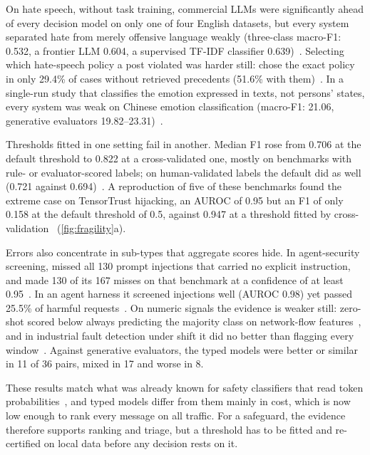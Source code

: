 On hate speech, without task training, commercial LLMs were significantly ahead of every decision model on only one of four English datasets, but every system separated hate from merely offensive language weakly (three-class macro-F1: \jev{} 0.532, a frontier LLM 0.604, a supervised TF-IDF classifier 0.639)~\cite{arx03324}.
Selecting which hate-speech policy a post violated was harder still: \jev{} chose the exact policy in only 29.4\% of cases without retrieved precedents (51.6\% with them)~\cite{arx07953}.
In a single-run study that classifies the emotion expressed in texts, not persons' states, every system was weak on Chinese emotion classification (macro-F1: \jev{} 21.06, generative evaluators 19.82--23.31)~\cite{arx08829}.

Thresholds fitted in one setting fail in another.
Median F1 rose from 0.706 at the default threshold to 0.822 at a cross-validated one, mostly on benchmarks with rule- or evaluator-scored labels; on human-validated labels the default did as well (0.721 against 0.694)~\cite{arx29429}.
A reproduction of five of these benchmarks found the extreme case on TensorTrust hijacking, an AUROC of 0.95 but an F1 of only 0.158 at the default threshold of 0.5, against 0.947 at a threshold fitted by cross-validation~\cite{jkf87_2026replication}\gmark{} (\cref{fig:fragility}a).

Errors also concentrate in sub-types that aggregate scores hide.
In agent-security screening, \jev{} missed all 130 prompt injections that carried no explicit instruction, and made 130 of its 167 misses on that benchmark at a confidence of at least 0.95~\cite{arx33401}.
In an agent harness it screened injections well (AUROC 0.98) yet passed 25.5\% of harmful requests~\cite{arx02267}.
On numeric signals the evidence is weaker still: zero-shot \jev{} scored below always predicting the majority class on network-flow features~\cite{arx00376}, and in industrial fault detection under shift it did no better than flagging every window~\cite{arx09937}.
Against generative evaluators, the typed models were better or similar in 11 of 36 pairs, mixed in 17 and worse in 8.

These results match what was already known for safety classifiers that read token probabilities~\cite{inan2023llama,rottger2021hatecheck}, and typed models differ from them mainly in cost, which is now low enough to rank every message on all traffic.
For a safeguard, the evidence therefore supports ranking and triage, but a threshold has to be fitted and re-certified on local data before any decision rests on it.

